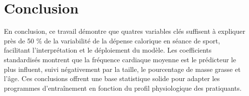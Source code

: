 \documentclass[12pt,a4paper]{article}
\begin{document}
\section{Conclusion}
En conclusion, ce travail démontre que quatres variables clés suffisent à expliquer près de 50 \% de la variabilité de la dépense calorique en séance de sport, facilitant l’interprétation et le déploiement du modèle. Les coefficients standardisés montrent que la fréquence cardiaque moyenne est le prédicteur le plus influent, suivi négativement par la taille, le pourcentage de masse grasse et l’âge. Ces conclusions offrent une base statistique solide pour adapter les programmes d’entraînement en fonction du profil physiologique des pratiquants. 

\newpage
\end{document}
